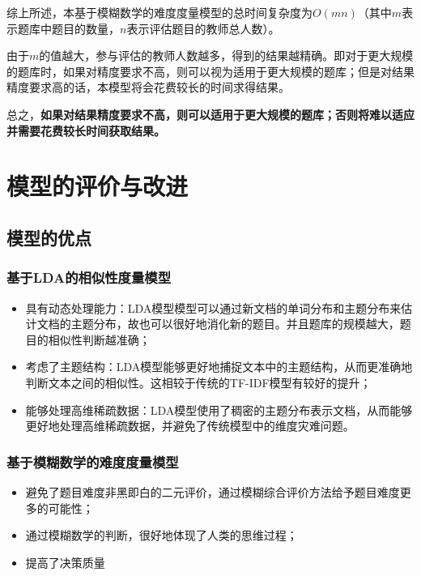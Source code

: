 综上所述，本基于模糊数学的难度度量模型的总时间复杂度为$O(mn)$（其中$m$表示题库中题目的数量，$n$表示评估题目的教师总人数）。

由于$m$的值越大，参与评估的教师人数越多，得到的结果越精确。即对于更大规模的题库时，如果对精度要求不高，则可以视为适用于更大规模的题库；但是对结果精度要求高的话，本模型将会花费较长的时间求得结果。

总之，\textbf{如果对结果精度要求不高，则可以适用于更大规模的题库；否则将难以适应并需要花费较长时间获取结果。}

%
%

\section{模型的评价与改进}

\subsection{模型的优点}

\subsubsection{基于LDA的相似性度量模型}

\begin{itemize}
    \item 具有动态处理能力：LDA模型模型可以通过新文档的单词分布和主题分布来估计文档的主题分布，故也可以很好地消化新的题目。并且题库的规模越大，题目的相似性判断越准确；
    \item 考虑了主题结构：LDA模型能够更好地捕捉文本中的主题结构，从而更准确地判断文本之间的相似性。这相较于传统的TF-IDF模型有较好的提升；
    \item 能够处理高维稀疏数据：LDA模型使用了稠密的主题分布表示文档，从而能够更好地处理高维稀疏数据，并避免了传统模型中的维度灾难问题。
\end{itemize}

\subsubsection{基于模糊数学的难度度量模型}

\begin{itemize}
    \item 避免了题目难度非黑即白的二元评价，通过模糊综合评价方法给予题目难度更多的可能性；
    \item 通过模糊数学的判断，很好地体现了人类的思维过程；
    \item 提高了决策质量
\end{itemize}

